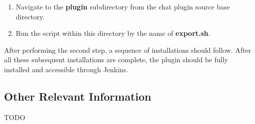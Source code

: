 \documentclass{article}
\begin{document}
		\begin{enumerate}
			\item Navigate to the \textbf{plugin} subdirectory from the chat
			plugin source base directory.

			\item Run the script within this directory by the name of 
			\textbf{export.sh}.
		\end{enumerate}

		After performing the second step, a sequence of installations should
		follow.  After all these subsequent installations are complete, the
		plugin should be fully installed and accessible through Jenkins.

		\subsection[Other Information]{Other Relevant Information}
		TODO
\end{document}
